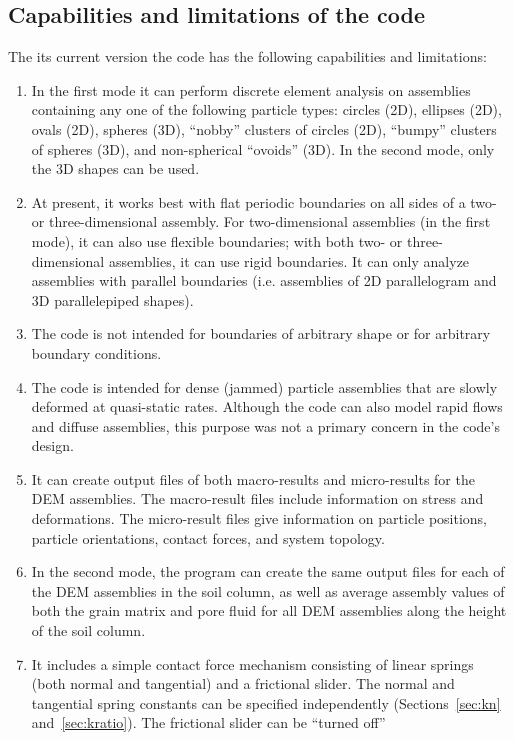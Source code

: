 \documentclass[letterpaper,11pt]{article}
\begin{document}
\subsection{Capabilities and limitations of the code}\label{sec:CapabilitiesOval}
The its current version the code has the following capabilities and
limitations:
\begin{enumerate}
\item
In the first mode
it can perform discrete element 
analysis on assemblies containing any one of the following particle
types:  circles (2D), ellipses (2D), ovals (2D), spheres (3D),
``nobby'' clusters of circles (2D),
``bumpy'' clusters of spheres (3D),
and non-spherical ``ovoids'' (3D).
In the second mode, only the 3D shapes can be used.
\item
At present, it works best with flat periodic boundaries 
on all sides of a two- or three-dimensional assembly.
For two-dimensional assemblies (in the first mode),
it can also use flexible boundaries;
with both two- or three-dimensional assemblies,
it can use rigid boundaries.
It can only analyze assemblies with parallel boundaries
(i.e. assemblies of 2D parallelogram and 3D parallelepiped shapes).
\item
The code is not intended for boundaries of arbitrary shape
or for arbitrary boundary conditions.
\item
The code is intended for dense (jammed) particle assemblies
that are slowly deformed at quasi-static rates.
Although the code can also model rapid flows and diffuse
assemblies, this purpose was not a primary concern in
the code's design.
\item
It can create output files of both macro-results and micro-results
for the DEM assemblies.
The macro-result files include information on stress and deformations.
The micro-result files give information on particle positions, particle 
orientations, contact forces, and system topology.
\item
In the second mode,
the program can create the same output files for each of the
DEM assemblies in the soil column, as well as average assembly
values of both the grain matrix and pore fluid for all
DEM assemblies along the height of the soil column.
\item
It includes a simple contact force mechanism consisting of linear springs 
(both normal and tangential) and
a frictional slider.  
The normal and tangential spring constants can
be specified independently (Sections~\ref{sec:kn} and~\ref{sec:kratio}).  
The frictional slider can be ``turned off''

\end{enumerate}
\end{document}
